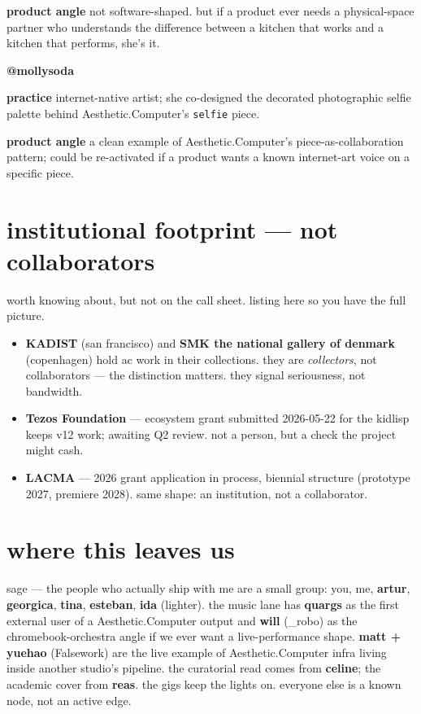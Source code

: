 \documentclass[11pt,letterpaper]{article}
\newcommand{\ac}{Aesthetic\textcolor{acpink}{.}Computer}
\newcommand{\person}[2]{%
  \vspace{0.9em}\noindent%
  {\normalfont\bfseries\fontsize{12pt}{14pt}\selectfont\color{acdark}#1}%
  \hspace{0.6em}{\footnotesize\color{acgray}\itshape #2}%
  \par\vspace{0.15em}\nopagebreak%
}
\newcommand{\field}[1]{\textbf{\small\color{acdark}#1}\hspace{0.3em}}
\begin{document}
\field{product angle} not software-shaped. but if a product ever needs a
physical-space partner who understands the difference between a kitchen
that works and a kitchen that performs, she's it.

\person{@mollysoda}{piece collaborator \textperiodcentered{} \texttt{selfie}}

\field{practice} internet-native artist; she co-designed the decorated
photographic selfie palette behind \ac{}'s \texttt{selfie} piece.

\field{product angle} a clean example of \ac{}'s piece-as-collaboration
pattern; could be re-activated if a product wants a known internet-art
voice on a specific piece.

\acbreak

\section{institutional footprint --- not collaborators}

worth knowing about, but not on the call sheet. listing here so you have
the full picture.

\begin{itemize}[leftmargin=1.4em]
  \item \textbf{KADIST} (san francisco) and \textbf{SMK \textperiodcentered{} the
    national gallery of denmark} (copenhagen) hold ac work in their
    collections. they are \textit{collectors}, not collaborators --- the
    distinction matters. they signal seriousness, not bandwidth.
  \item \textbf{Tezos Foundation} --- ecosystem grant submitted 2026-05-22
    for the kidlisp keeps v12 work; awaiting Q2 review. not a person, but
    a check the project might cash.
  \item \textbf{LACMA} --- 2026 grant application in process, biennial
    structure (prototype 2027, premiere 2028). same shape: an institution,
    not a collaborator.
\end{itemize}

\acbreak

\section{where this leaves us}

sage --- the people who actually ship with me are a small group: you, me,
\textbf{artur}, \textbf{georgica}, \textbf{tina}, \textbf{esteban},
\textbf{ida} (lighter). the music lane has \textbf{quargs} as the first
external user of a \ac{} output and \textbf{will} (\@c\_robo) as the
chromebook-orchestra angle if we ever want a live-performance shape.
\textbf{matt + yuehao} (Falsework) are the live example of \ac{} infra
living inside another studio's pipeline. the curatorial read comes from
\textbf{celine}; the academic cover from \textbf{reas}. the gigs keep the
lights on. everyone else is a known node, not an active edge.
\end{document}
